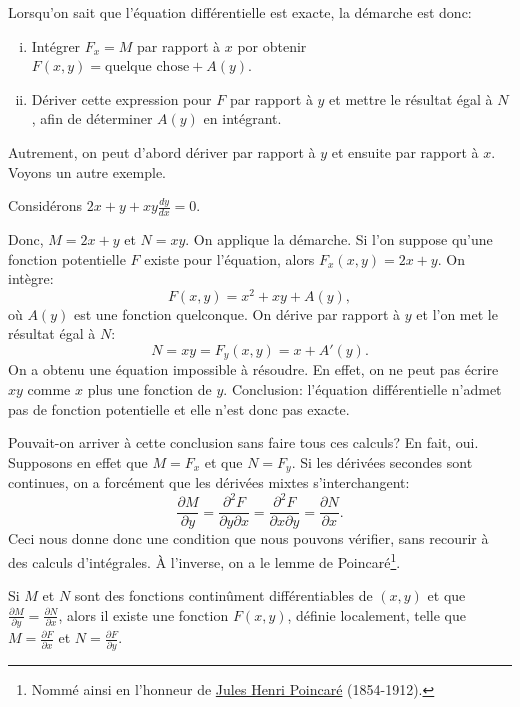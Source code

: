 Lorsqu'on sait que l'équation différentielle est exacte, la démarche est donc:
\begin{enumerate}[(i)]
	\item Intégrer $F_x = M$ par rapport à $x$ por obtenir $F(x, y) = \text{quelque chose} + A(y)$.
	\item Dériver cette expression pour $F$ par rapport à $y$ et mettre le résultat égal à
			$N$, afin de déterminer $A(y)$ en intégrant.
\end{enumerate}
Autrement, on peut d'abord dériver par rapport à $y$ et ensuite par rapport à $x$.
Voyons un autre exemple.

\begin{example}
	Considérons $2x+y + xy \frac{dy}{dx} = 0$.

	Donc, $M = 2x+y$ et $N=xy$.  On applique la démarche.
	Si l'on suppose qu'une fonction potentielle $F$ existe pour l'équation, alors $F_x (x,y) = 2x+y$.
	On intègre:
	\begin{equation*}
		F(x,y) = x^2 + xy + A(y),
	\end{equation*}
	où $A(y)$ est une fonction quelconque. On dérive par rapport à $y$ et l'on met le résultat égal à $N$:
	\begin{equation*}
		N = xy = F_y (x,y) = x+A'(y) .
	\end{equation*}
	On a obtenu une équation impossible à résoudre.  En effet, on ne peut pas écrire $xy$ comme
	$x$ plus une fonction de $y$.
	Conclusion: l'équation différentielle n'admet pas de fonction potentielle et elle n'est donc pas exacte.
\end{example}

Pouvait-on arriver à cette conclusion sans faire tous ces calculs?  En fait, oui.  Supposons en effet que
$M = F_x$ et que 
$N = F_y$.  Si les dérivées secondes sont continues, on a forcément que les dérivées mixtes s'interchangent:
\begin{equation*}
	\frac{\partial M}{\partial y}
		= 	\frac{\partial^2 F}{\partial y \partial x}
		=	\frac{\partial^2 F}{\partial x \partial y}
		= 	\frac{\partial N}{\partial x} .
\end{equation*}
Ceci nous donne donc une condition que nous pouvons vérifier, sans recourir à des calculs d'intégrales.
À l'inverse, on a le lemme de Poincaré$\!$\footnote{Nommé ainsi en l'honneur de
\href{https://en.wikipedia.org/wiki/Henri_Poincar\%C3\%A9}{Jules Henri
Poincaré} (1854-1912).}.

\begin{theorem}[Poincaré]
Si $M$ et $N$ sont des fonctions continûment différentiables de $(x, y)$ et
que $\frac{\partial M}{\partial y} = \frac{\partial N}{\partial x}$,
alors il existe une fonction $F(x,y)$, définie localement, telle que $M = \frac{\partial F}{\partial x}$ et
$N = \frac{\partial F}{\partial y}$.
\end{theorem}

